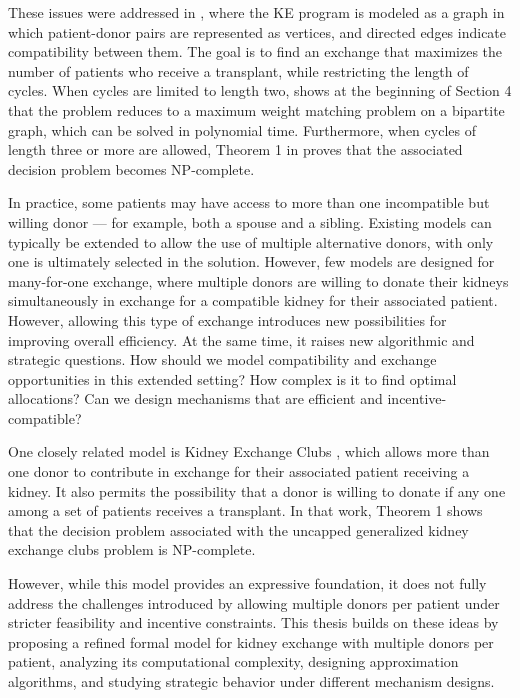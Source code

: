 These issues were addressed in \cite{abraham2007clearing}, where the \ac{KE} program is modeled as a graph in which patient-donor pairs are represented as vertices, and directed edges indicate compatibility between them. The goal is to find an exchange that maximizes the number of patients who receive a transplant, while restricting the length of cycles. When cycles are limited to length two, \cite{abraham2007clearing} shows at the beginning of Section 4 that the problem reduces to a maximum weight matching problem on a bipartite graph, which can be solved in polynomial time. Furthermore, when cycles of length three or more are allowed, Theorem 1 in \cite{abraham2007clearing} proves that the associated decision problem becomes NP-complete.

In practice, some patients may have access to more than one incompatible but willing donor — for example, both a spouse and a sibling. Existing models can typically be extended to allow the use of multiple alternative donors, with only one is ultimately selected in the solution. However, few models are designed for many-for-one exchange, where multiple donors are willing to donate their kidneys simultaneously in exchange for a compatible kidney for their associated patient. However, allowing this type of exchange introduces new possibilities for improving overall efficiency. At the same time, it raises new algorithmic and strategic questions. How should we model compatibility and exchange opportunities in this extended setting? How complex is it to find optimal allocations? Can we design mechanisms that are efficient and incentive-compatible?

One closely related model is Kidney Exchange Clubs \cite{farina2017operation}, which allows more than one donor to contribute in exchange for their associated patient receiving a kidney. It also permits the possibility that a donor is willing to donate if any one among a set of patients receives a transplant. In that work, Theorem 1 shows that the decision problem associated with the uncapped generalized kidney exchange clubs problem is NP-complete.

However, while this model provides an expressive foundation, it does not fully address the challenges introduced by allowing multiple donors per patient under stricter feasibility and incentive constraints. This thesis builds on these ideas by proposing a refined formal model for kidney exchange with multiple donors per patient, analyzing its computational complexity, designing approximation algorithms, and studying strategic behavior under different mechanism designs.

